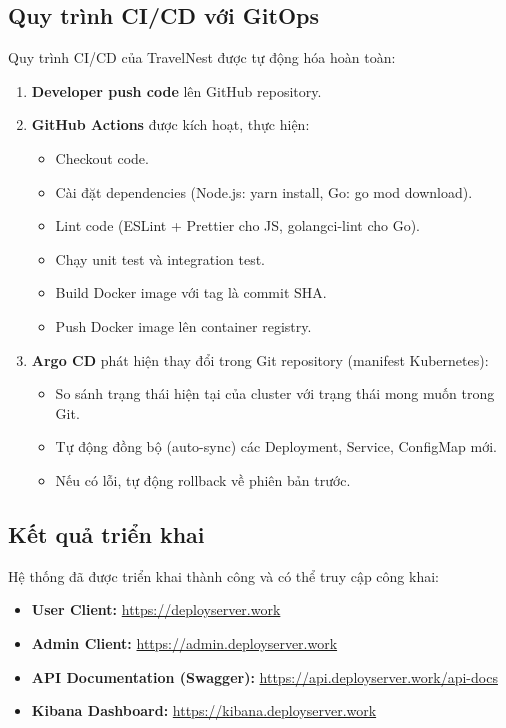 \documentclass[13pt,a4paper,twoside]{report}
\begin{document}
\subsection{Quy trình CI/CD với GitOps}

Quy trình CI/CD của TravelNest được tự động hóa hoàn toàn:

\begin{enumerate}
  \item \textbf{Developer push code} lên GitHub repository.
  \item \textbf{GitHub Actions} được kích hoạt, thực hiện:
  \begin{itemize}
    \item Checkout code.
    \item Cài đặt dependencies (Node.js: yarn install, Go: go mod download).
    \item Lint code (ESLint + Prettier cho JS, golangci-lint cho Go).
    \item Chạy unit test và integration test.
    \item Build Docker image với tag là commit SHA.
    \item Push Docker image lên container registry.
  \end{itemize}
  \item \textbf{Argo CD} phát hiện thay đổi trong Git repository (manifest Kubernetes):
  \begin{itemize}
    \item So sánh trạng thái hiện tại của cluster với trạng thái mong muốn trong Git.
    \item Tự động đồng bộ (auto-sync) các Deployment, Service, ConfigMap mới.
    \item Nếu có lỗi, tự động rollback về phiên bản trước.
  \end{itemize}
\end{enumerate}

\subsection{Kết quả triển khai}

Hệ thống đã được triển khai thành công và có thể truy cập công khai:

\begin{itemize}
  \item \textbf{User Client:} \url{https://deployserver.work}
  \item \textbf{Admin Client:} \url{https://admin.deployserver.work}
  \item \textbf{API Documentation (Swagger):} \url{https://api.deployserver.work/api-docs}
  \item \textbf{Kibana Dashboard:} \url{https://kibana.deployserver.work}
\end{itemize}
\end{document}
